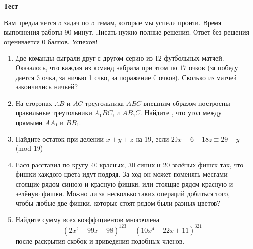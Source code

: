 \documentclass{article}
\begin{document}
\large
	
	
\begin{center}
	\textbf{Тест}
\end{center}

Вам предлагается 5 задач по 5 темам, которые мы успели пройти. Время выполнения работы 90 минут. Писать нужно полные решения. Ответ без решения оценивается 0 баллов. Успехов!

\begin{enumerate}

\item Две команды сыграли друг с другом серию из $12$ футбольных матчей. Оказалось, что каждая из команд набрала при этом по $17$ очков (за победу дается 3 очка, за ничью 1 очко, за поражение 0 очков). Сколько из матчей закончились ничьей?

\item На сторонах $AB$ и $AC$ треугольника $ABC$ внешним образом построены правильные треугольники $A_1BC$, и $AB_1C$. Найдите , что угол между прямыми $AA_1$ и $BB_1$.

\item Найдите остаток при делении $x + y + z$ на 19, если $20x + 6 - 18z \equiv 29 - y$ (mod 19)

\item Вася расставил по кругу 40 красных, 30 синих и 20 зелёных фишек так, что фишки каждого цвета идут подряд. За ход он может поменять местами стоящие рядом синюю и красную фишки, или стоящие рядом красную и зелёную фишки. Можно ли за несколько таких операций добиться того, чтобы любые две фишки, которые стоят рядом были разных цветов?

\item Найдите сумму всех коэффициентов многочлена $$(2x^2 - 99x + 98)^{123} + (10x^4 - 22x + 11)^{321}$$ после раскрытия скобок и приведения подобных членов.


\end{enumerate}
\end{document}
